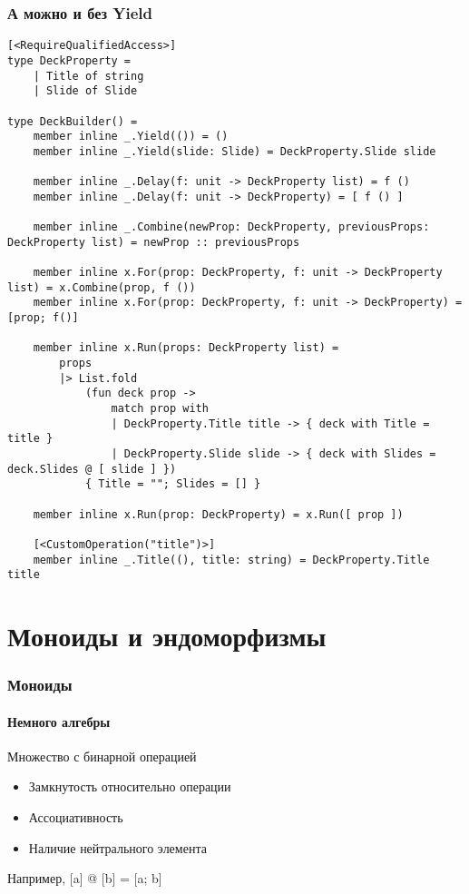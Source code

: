 \documentclass{../../slides-style}
\begin{document}
    \begin{frame}[fragile]
        \frametitle{А можно и без Yield}
        \begin{ssmall}
            \begin{verbatim}
[<RequireQualifiedAccess>]
type DeckProperty =
    | Title of string
    | Slide of Slide

type DeckBuilder() =
    member inline _.Yield(()) = ()
    member inline _.Yield(slide: Slide) = DeckProperty.Slide slide

    member inline _.Delay(f: unit -> DeckProperty list) = f ()
    member inline _.Delay(f: unit -> DeckProperty) = [ f () ]

    member inline _.Combine(newProp: DeckProperty, previousProps: DeckProperty list) = newProp :: previousProps

    member inline x.For(prop: DeckProperty, f: unit -> DeckProperty list) = x.Combine(prop, f ())
    member inline x.For(prop: DeckProperty, f: unit -> DeckProperty) = [prop; f()]

    member inline x.Run(props: DeckProperty list) =
        props
        |> List.fold
            (fun deck prop ->
                match prop with
                | DeckProperty.Title title -> { deck with Title = title }
                | DeckProperty.Slide slide -> { deck with Slides = deck.Slides @ [ slide ] })
            { Title = ""; Slides = [] }

    member inline x.Run(prop: DeckProperty) = x.Run([ prop ])

    [<CustomOperation("title")>]
    member inline _.Title((), title: string) = DeckProperty.Title title
            \end{verbatim}
        \end{ssmall}
    \end{frame}

    \section{Моноиды и эндоморфизмы}

    \begin{frame}
        \frametitle{Моноиды}
        \framesubtitle{Немного алгебры}
        Множество с бинарной операцией
        \begin{itemize}
            \item Замкнутость относительно операции
            \item Ассоциативность
            \item Наличие нейтрального элемента
        \end{itemize}
        Например, [a] @ [b] = [a; b]
    \end{frame}
\end{document}
